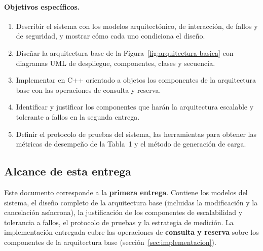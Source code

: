 \paragraph{Objetivos específicos.}
\begin{enumerate}
    \item Describir el sistema con los modelos arquitectónico, de interacción, de
          fallos y de seguridad, y mostrar cómo cada uno condiciona el diseño.
    \item Diseñar la arquitectura base de la Figura~\ref{fig:arquitectura-basica} con
          diagramas UML de despliegue, componentes, clases y secuencia.
    \item Implementar en C++ orientado a objetos los componentes de la arquitectura
          base con las operaciones de consulta y reserva.
    \item Identificar y justificar los componentes que harán la arquitectura escalable
          y tolerante a fallos en la segunda entrega.
    \item Definir el protocolo de pruebas del sistema, las herramientas para obtener
          las métricas de desempeño de la Tabla~1 y el método de generación de carga.
\end{enumerate}

\subsection{Alcance de esta entrega}

Este documento corresponde a la \textbf{primera entrega}. Contiene los modelos del
sistema, el diseño completo de la arquitectura base (incluidas la modificación y
la cancelación asíncrona), la justificación de los componentes de escalabilidad y
tolerancia a fallos, el protocolo de pruebas y la estrategia de medición. La
implementación entregada cubre las operaciones de \textbf{consulta y reserva}
sobre los componentes de la arquitectura base (sección~\ref{sec:implementacion}).
